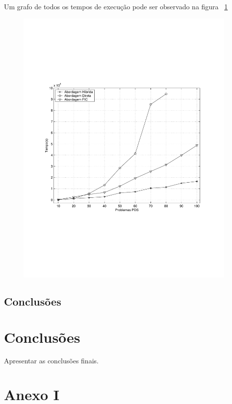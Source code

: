 \documentclass[a4paper,12pt,fleqn]{article}
\begin{document}
Um grafo de todos os tempos de execução pode ser observado na figura ~\ref{fig:pdsmodel} 
 
\begin{figure}[htb] 
\centering 
 
\includegraphics[height=14cm]{Images/figura} 
\label{fig:pdsmodel} 
\end{figure} 
 
\subsection{Conclusões} 
 
\clearpage 
\section{Conclusões} 
Apresentar as conclusões finais. 
 
\clearpage 
 
   
 
\appendix 
 
\section{Anexo I} 
\label{anex1} 
 
\end{document}
